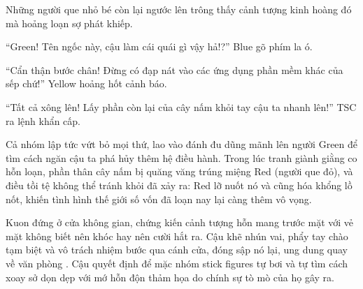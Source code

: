 \documentclass[../main.tex]{subfiles}
\begin{document}
Những người que nhỏ bé còn lại ngước lên trông thấy cảnh tượng kinh hoàng đó mà hoảng loạn sợ phát khiếp.

``Green! Tên ngốc này, cậu làm cái quái gì vậy hả!?'' Blue gõ phím la ó.

``Cẩn thận bước chân! Đừng có đạp nát vào các ứng dụng phần mềm khác của sếp chứ!'' Yellow hoảng hốt cảnh báo.

``Tất cả xông lên! Lấy phần còn lại của cây nấm khỏi tay cậu ta nhanh lên!'' TSC ra lệnh khẩn cấp.

Cả nhóm lập tức vứt bỏ mọi thứ, lao vào đánh đu dũng mãnh lên người Green để tìm cách ngăn cậu ta phá hủy thêm hệ điều hành. Trong lúc tranh giành giằng co hỗn loạn, phần thân cây nấm bị quăng văng trúng miệng Red (người que đỏ), và điều tồi tệ không thể tránh khỏi đã xảy ra: Red lỡ nuốt nó và cũng hóa khổng lồ nốt, khiến tình hình thế giới số vốn đã loạn nay lại càng thêm vô vọng.

Kuon đứng ở cửa không gian, chứng kiến cảnh tượng hỗn mang trước mặt với vẻ mặt không biết nên khóc hay nên cười hắt ra. Cậu khẽ nhún vai, phẩy tay chào tạm biệt và vô trách nhiệm bước qua cánh cửa, đóng sập nó lại, ung dung quay về văn phòng \hll. Cậu quyết định để mặc nhóm stick figures tự bơi và tự tìm cách xoay sở dọn dẹp với mớ hỗn độn thảm họa do chính sự tò mò của họ gây ra.
\end{document}
